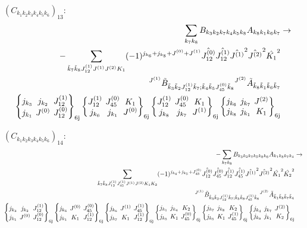 \documentclass[11pt]{article}
\newcommand{\sixj}[6]{\begingroup\setlength{\arraycolsep}{0.2em}\begin{Bmatrix} #1 & #2 & #3 \\ #4 & #5 & #6 \end{Bmatrix}_{\text{6j}}\endgroup}
\begin{document}
$\left({C}_{{k}_{1}{k}_{2}{k}_{3}{k}_{4}{k}_{5}{k}_{6}}\right)_{13}$:
\begin{align}
\sum_{{k}_{7}{k}_{8}}{B}_{{k}_{3}{k}_{2}{k}_{7}{k}_{4}{k}_{5}{k}_{8}}{A}_{{k}_{8}{k}_{1}{k}_{6}{k}_{7}}&\rightarrow \notag \\-\sum_{\tilde{k}_{7}\tilde{k}_{8}J^{(1)}_{12}J^{(1)}J^{(2)}K_{1}}(-1)^{j_{{k}_{6}} +j_{{k}_{8}} +J^{(0)} +J^{(1)} }\hat{J^{(0)}_{12}}\hat{J^{(1)}_{12}}\hat{J^{(1)}}^{2}\hat{J^{(2)}}^{2}\hat{K_{1}}^{2}& \notag \\{}^{J^{(1)}}\tilde{B}_{\tilde{k}_{3}\tilde{k}_{2}J^{(1)}_{12}\tilde{k}_{7};\tilde{k}_{4}\tilde{k}_{5}J^{(0)}_{45}\tilde{k}_{8}}{}^{J^{(2)}}\tilde{A}_{\tilde{k}_{8}\tilde{k}_{1}\tilde{k}_{6}\tilde{k}_{7}}& \notag \\\sixj{j_{{k}_{3}}}{j_{{k}_{2}}}{J^{(1)}_{12}}{j_{{k}_{1}}}{J^{(0)}}{J^{(0)}_{12}}\sixj{J^{(1)}_{12}}{J^{(0)}_{45}}{K_{1}}{j_{{k}_{6}}}{j_{{k}_{1}}}{J^{(0)}}\sixj{J^{(1)}_{12}}{J^{(0)}_{45}}{K_{1}}{j_{{k}_{8}}}{j_{{k}_{7}}}{J^{(1)}}\sixj{j_{{k}_{6}}}{j_{{k}_{7}}}{J^{(2)}}{j_{{k}_{8}}}{j_{{k}_{1}}}{K_{1}}
\end{align}

$\left({C}_{{k}_{1}{k}_{2}{k}_{3}{k}_{4}{k}_{5}{k}_{6}}\right)_{14}$:
\begin{align}
-\sum_{{k}_{7}{k}_{8}}{B}_{{k}_{3}{k}_{2}{k}_{7}{k}_{5}{k}_{8}{k}_{6}}{A}_{{k}_{1}{k}_{8}{k}_{7}{k}_{4}}&\rightarrow \notag \\\sum_{\tilde{k}_{7}\tilde{k}_{8}J^{(1)}_{12}J^{(1)}_{45}J^{(1)}J^{(2)}K_{1}K_{2}}(-1)^{j_{{k}_{4}} +j_{{k}_{5}} +J^{(0)}_{45} }\hat{J^{(0)}_{12}}\hat{J^{(0)}_{45}}\hat{J^{(1)}_{12}}\hat{J^{(1)}_{45}}\hat{J^{(1)}}^{2}\hat{J^{(2)}}^{2}\hat{K_{1}}^{2}\hat{K_{2}}^{2}& \notag \\{}^{J^{(1)}}\tilde{B}_{\tilde{k}_{3}\tilde{k}_{2}J^{(1)}_{12}\tilde{k}_{7};\tilde{k}_{5}\tilde{k}_{8}J^{(1)}_{45}\tilde{k}_{6}}{}^{J^{(2)}}\tilde{A}_{\tilde{k}_{1}\tilde{k}_{8}\tilde{k}_{7}\tilde{k}_{4}}& \notag \\\sixj{j_{{k}_{3}}}{j_{{k}_{2}}}{J^{(1)}_{12}}{j_{{k}_{1}}}{J^{(0)}}{J^{(0)}_{12}}\sixj{j_{{k}_{6}}}{J^{(0)}}{J^{(0)}_{45}}{j_{{k}_{1}}}{K_{1}}{J^{(1)}_{12}}\sixj{j_{{k}_{6}}}{J^{(1)}}{J^{(1)}_{45}}{j_{{k}_{7}}}{K_{1}}{J^{(1)}_{12}}\sixj{j_{{k}_{1}}}{j_{{k}_{4}}}{K_{2}}{j_{{k}_{5}}}{K_{1}}{J^{(0)}_{45}}\sixj{j_{{k}_{7}}}{j_{{k}_{8}}}{K_{2}}{j_{{k}_{5}}}{K_{1}}{J^{(1)}_{45}}\sixj{j_{{k}_{4}}}{j_{{k}_{7}}}{J^{(2)}}{j_{{k}_{8}}}{j_{{k}_{1}}}{K_{2}}
\end{align}
\end{document}
